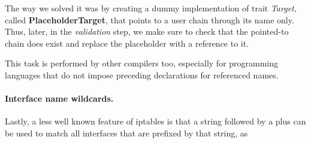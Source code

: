The way we solved it was by creating a dummy implementation of trait
\emph{Target}, called \textbf{PlaceholderTarget}, that points to a user chain
through its name only.  Thus, later, in the \emph{validation} step, we make
sure to check that the pointed-to chain does exist and replace the placeholder
with a reference to it.

This task is performed by other compilers too, especially for programming
languages that do not impose preceding declarations for referenced names.

\paragraph{Interface name wildcards.}
Lastly, a less well known feature of iptables is that a string followed by a
plus can be used to match all interfaces that are prefixed by that string, as
